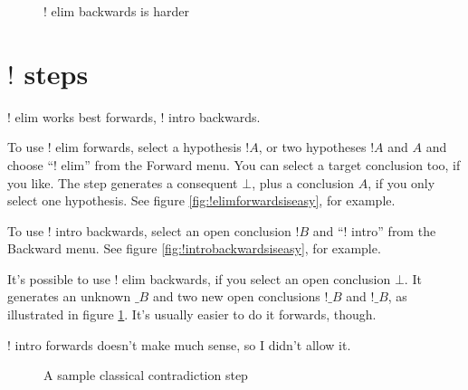 \documentclass[11pt]{book}
\newcommand{\figref}[1]{figure \ref{fig:#1}}
\begin{document}
\begin{figure}
\caption{$!$ elim backwards is harder}
\label{fig:!elimbackwardsisharder}
\end{figure}

\section{$!$ steps}

$!$ elim works best forwards, $!$ intro backwards.

To use $!$ elim forwards, select a hypothesis $!A$, or two hypotheses $!A$ and $A$ and choose ``$!$ elim'' from the Forward menu. You can select a target conclusion too, if you like. The step generates a consequent $\bot$, plus a conclusion $A$, if you only select one hypothesis. See \figref{!elimforwardsiseasy}, for example.

To use $!$ intro backwards, select an open conclusion $!B$ and ``$!$ intro'' from the Backward menu. See \figref{!introbackwardsiseasy}, for example.

It's possible to use $!$ elim backwards, if you select an open conclusion $\bot$. It generates an unknown $\_B$ and two new open conclusions $!\_B$ and $!\_B$, as illustrated in \figref{!elimbackwardsisharder}. It's usually easier to do it forwards, though.

$!$ intro forwards doesn't make much sense, so I didn't allow it.

\begin{figure}
\centering
{}
\qquad
{}
\caption{A sample classical contradiction step}
\label{fig:classicalcontrastep}
\end{figure}
\end{document}
